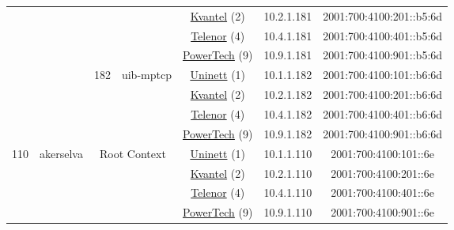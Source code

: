\begin{small}
\begin{center}
\begin{longtable}{|c|c|c|c|c|c|c|c|}
  &  &  &  & \multicolumn{2}{|c|}{\tiny{\href{http://kvantel.no}{Kvantel} (2)}} & \tiny{10.2.1.181} & \tiny{2001:700:4100:201::b5:6d} \\* \cline{5-5}\cline{6-6}\cline{7-7}\cline{8-8}
  &  &  &  & \multicolumn{2}{|c|}{\tiny{\href{https://www.telenor.no}{Telenor} (4)}} & \tiny{10.4.1.181} & \tiny{2001:700:4100:401::b5:6d} \\* \cline{5-5}\cline{6-6}\cline{7-7}\cline{8-8}
  &  &  &  & \multicolumn{2}{|c|}{\tiny{\href{http://www.powertech.no}{PowerTech} (9)}} & \tiny{10.9.1.181} & \tiny{2001:700:4100:901::b5:6d} \\* \cline{3-3}\cline{4-4}\cline{5-5}\cline{6-6}\cline{7-7}\cline{8-8}
  &  & \multirow{4}{*}{\tiny{182}} & \multicolumn{1}{|l|}{\multirow{4}{*}{\tiny{uib-mptcp}}} & \multicolumn{2}{|c|}{\tiny{\href{https://www.uninett.no}{Uninett} (1)}} & \tiny{10.1.1.182} & \tiny{2001:700:4100:101::b6:6d} \\* \cline{5-5}\cline{6-6}\cline{7-7}\cline{8-8}
  &  &  &  & \multicolumn{2}{|c|}{\tiny{\href{http://kvantel.no}{Kvantel} (2)}} & \tiny{10.2.1.182} & \tiny{2001:700:4100:201::b6:6d} \\* \cline{5-5}\cline{6-6}\cline{7-7}\cline{8-8}
  &  &  &  & \multicolumn{2}{|c|}{\tiny{\href{https://www.telenor.no}{Telenor} (4)}} & \tiny{10.4.1.182} & \tiny{2001:700:4100:401::b6:6d} \\* \cline{5-5}\cline{6-6}\cline{7-7}\cline{8-8}
  &  &  &  & \multicolumn{2}{|c|}{\tiny{\href{http://www.powertech.no}{PowerTech} (9)}} & \tiny{10.9.1.182} & \tiny{2001:700:4100:901::b6:6d} \\ \hline
 \multirow{28}{*}{\tiny{110}} & \multicolumn{1}{|l|}{\multirow{28}{*}{\tiny{akerselva}}} & \multicolumn{2}{|c|}{\multirow{4}{*}{\tiny{Root Context}}} & \multicolumn{2}{|c|}{\tiny{\href{https://www.uninett.no}{Uninett} (1)}} & \tiny{10.1.1.110} & \tiny{2001:700:4100:101::6e} \\* \cline{5-5}\cline{6-6}\cline{7-7}\cline{8-8}
  &  & \multicolumn{2}{|c|}{} & \multicolumn{2}{|c|}{\tiny{\href{http://kvantel.no}{Kvantel} (2)}} & \tiny{10.2.1.110} & \tiny{2001:700:4100:201::6e} \\* \cline{5-5}\cline{6-6}\cline{7-7}\cline{8-8}
  &  & \multicolumn{2}{|c|}{} & \multicolumn{2}{|c|}{\tiny{\href{https://www.telenor.no}{Telenor} (4)}} & \tiny{10.4.1.110} & \tiny{2001:700:4100:401::6e} \\* \cline{5-5}\cline{6-6}\cline{7-7}\cline{8-8}
  &  & \multicolumn{2}{|c|}{} & \multicolumn{2}{|c|}{\tiny{\href{http://www.powertech.no}{PowerTech} (9)}} & \tiny{10.9.1.110} & \tiny{2001:700:4100:901::6e} \\* \cline{3-3}\cline{4-4}\cline{5-5}\cline{6-6}\cline{7-7}\cline{8-8}

\end{longtable}
\end{center}
\end{small}

